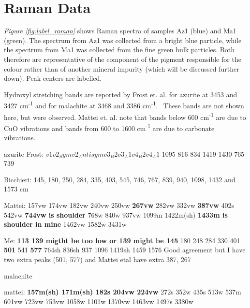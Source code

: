 
\section[Raman Data]{Raman Data}
\label{section3.3}


\textit{Figure \ref{fig:label_raman}} shows Raman spectra of samples Az1 (blue) and Ma1 (green). The spectrum from Az1 was collected from a bright blue particle, while the spectrum from Ma1 was collected from the fine green bulk particles. Both therefore are representative of the component of the pigment responsible for the colour rather than of another mineral impurity (which will be discussed further down). Peak centers are labelled.

Hydroxyl stretching bands are reported by Frost et. al. for azurite at 3453 and 3427 cm\textsuperscript{-1} and for malachite at 3468 and 3386 cm\textsuperscript{-1}.~\autocite{Frost} These bands are not shown here, but were observed. Mattei et. al. note that bands below 600 cm\textsuperscript{-1} are due to CuO vibrations and bands from 600 to 1600 cm\textsuperscript{-1} are due to carbonate vibrations.


azurite
Frost: $v1    v2_Sym  v2_Antisym   v3_B2   v3_A1    v4_B2   v4_A1$
       1095   816       834        1419    1430     765     739

Bicchieri: 145, 180, 250, 284, 335, 403, 545, 746, 767, 839, 940, 1098, 1432 and 1573 cm

Mattei: 157vw 174vw 182vw 240vw 250vw \textbf{267vw} 282vw 332vw
\textbf{387vw} 402s 542vw \textbf{744vw is shoulder} 768w 840w 937vw 1099m
1422m(sh) \textbf{1433m is shoulder in mine} 1462vw 1582w 3431w

Me: \textbf{113 139 migtht be too low or 139 might be 145} 180 248 284 330 401 \textbf{501} 541 \textbf{577} 764sh 836sh  937 1096 1419sh 1459 1576
Good agreement but I have two extra peaks (501, 577) and Mattei etal have extra 387, 267


malachite

mattei: \textbf{157m(sh) 171m(sh) 182s 204vw 224vw} 272s 352w 435s 513w
537m 601vw 723vw 753vw 1058w 1101w 1370vw 1463vw
1497s 3380w


